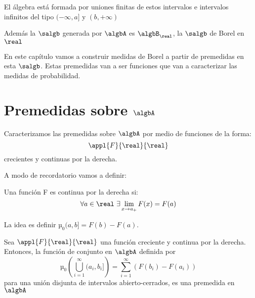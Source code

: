 \documentclass{apuntes}
\begin{document}
\obs El álgebra está formada por uniones finitas de estos intervalos e intervalos infinitos del tipo $(-\infty, a]$ y $(b, +\infty)$

Además la $\salgb$ generada por $\algbA$ es $\algbB_{\real}$, la $\salgb$ de Borel en $\real$

En este capítulo vamos a construir medidas de Borel a partir de premedidas en esta $\salgb$. Estas premedidas van a ser funciones que van a caracterizar las medidas de probabilidad.

\section{Premedidas sobre $\algbA$}
Caracterizamos las premedidas sobre $\algbA$ por medio de funciones de la forma:
\[\appl{F}{\real}{\real}\]
crecientes y continuas por la derecha.

A modo de recordatorio vamos a definir:

\begin{defn}
Una función F es continua por la derecha si:
\[\forall a \in \real \ \exists \lim_{x \to a_+}F(x)=F(a)\]
\end{defn}

La idea es definir $µ_0(a,b]=F(b)-F(a)$.

\begin{prop}
Sea $\appl{F}{\real}{\real}$ una función creciente y continua por la derecha. Entonces, la función de conjunto en $\algbA$ definida por
\[µ_0\left(\bigcup_{i=1}^{\infty}(a_i, b_i]\right) = \sum_{i=1}^{\infty}(F(b_i)-F(a_i))\]
para una unión disjunta de intervalos abierto-cerrados, es una premedida en $\algbA$
\end{prop}
\end{document}
